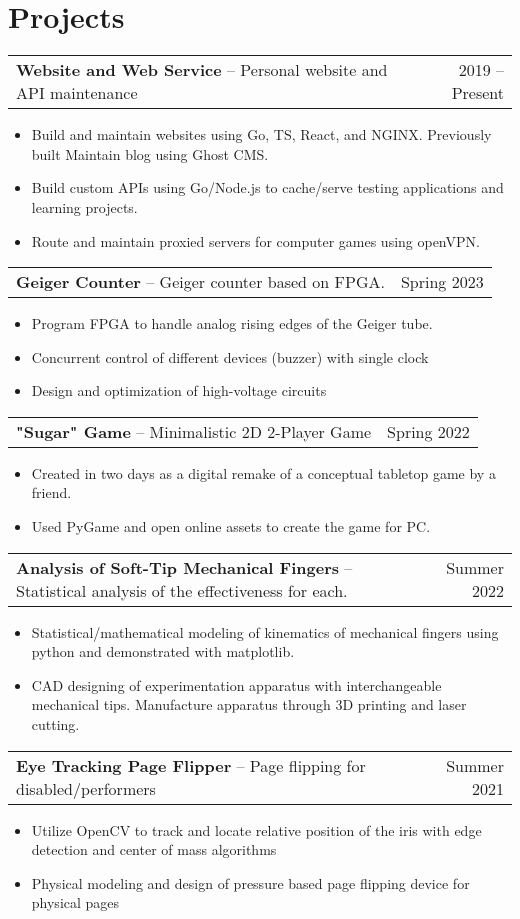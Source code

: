 \documentclass[oneside, 11pt]{article}
\newcommand*{\projectEntry}[3]{
	\noindent
	\begin{tabularx}{\textwidth}{Xr}
	\textbf{#1} -- #3 & #2
	\end{tabularx}
	\vspace{-1.25\baselineskip}
}
\newenvironment{expD}
	{\begin{itemize}[noitemsep,topsep=0pt]}
	{\end{itemize}}
\begin{document}
\section*{Projects}

\projectEntry{Website and Web Service}
	{2019 -- Present}
	{Personal website and API maintenance}

\begin{expD}
	\item Build and maintain websites using Go, TS, React, and NGINX. Previously built  Maintain blog using Ghost CMS.
	\item Build custom APIs using Go/Node.js to cache/serve testing applications and learning projects.
	\item Route and maintain proxied servers for computer games using openVPN.
\end{expD}

\projectEntry{Geiger Counter}
	{Spring 2023}
	{Geiger counter based on FPGA.}

\begin{expD}
	\item Program FPGA to handle analog rising edges of the Geiger tube.
	\item Concurrent control of different devices (buzzer) with single clock
	\item Design and optimization of high-voltage circuits
\end{expD}

\projectEntry{"Sugar" Game}
	{Spring 2022}
	{Minimalistic 2D 2-Player Game}

\begin{expD}
	\item Created in two days as a digital remake of a conceptual tabletop game by a friend.
	\item Used PyGame and open online assets to create the game for PC.
\end{expD}

\projectEntry{Analysis of Soft-Tip Mechanical Fingers}
	{Summer 2022}
	{Statistical analysis of the effectiveness for each.}

\begin{expD}
	\item Statistical/mathematical modeling of kinematics of mechanical fingers using python and demonstrated with matplotlib.
	\item CAD designing of experimentation apparatus with interchangeable mechanical tips. Manufacture apparatus through 3D printing and laser cutting.
\end{expD}

\projectEntry{Eye Tracking Page Flipper}
	{Summer 2021}
	{Page flipping for disabled/performers}

\begin{expD}
	\item Utilize OpenCV to track and locate relative position of the iris with edge detection and center of mass algorithms
	\item Physical modeling and design of pressure based page flipping device for physical pages
\end{expD}
\end{document}

